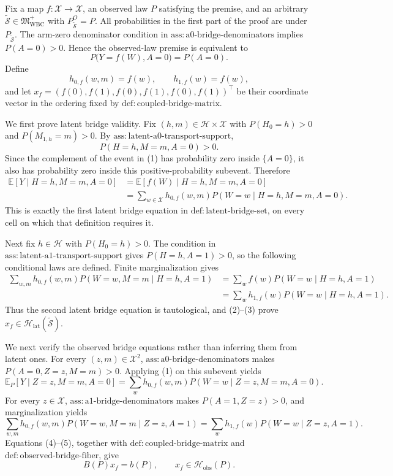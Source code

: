 Fix a map \(f:\mathcal X\to\mathcal X\), an observed law \(P\) satisfying the premise, and an arbitrary \(\widetilde{\mathcal S}\in\mathfrak M_{\mathrm{WBC}}^{+}\) with \(P_{\widetilde{\mathcal S}}^O=P\). All probabilities in the first part of the proof are under \(P_{\widetilde{\mathcal S}}\). The arm-zero denominator condition in \(\mathrm{ass{:}a0\text{-}bridge\text{-}denominators}\) implies \(P(A=0)>0\). Hence the observed-law premise is equivalent to
\[
P\bigl(Y=f(W),A=0\bigr)=P(A=0).
\tag{1}
\]
Define
\[
h_{0,f}(w,m)=f(w),\qquad h_{1,f}(w)=f(w),
\]
and let \(x_f=(f(0),f(1),f(0),f(1),f(0),f(1))^{\top}\) be their coordinate vector in the ordering fixed by \(\mathrm{def{:}coupled\text{-}bridge\text{-}matrix}\).

We first prove latent bridge validity. Fix \((h,m)\in\mathcal H\times\mathcal X\) with \(P(H_0=h)>0\) and \(P(M_{1,h}=m)>0\). By \(\mathrm{ass{:}latent\text{-}a0\text{-}transport\text{-}support}\),
\[
P(H=h,M=m,A=0)>0.
\]
Since the complement of the event in (1) has probability zero inside \(\{A=0\}\), it also has probability zero inside this positive-probability subevent. Therefore
\[
\begin{aligned}
\mathbb E[Y\mid H=h,M=m,A=0]
&=\mathbb E[f(W)\mid H=h,M=m,A=0]\\
&=\sum_{w\in\mathcal X}h_{0,f}(w,m)
  P(W=w\mid H=h,M=m,A=0).
\end{aligned}
\tag{2}
\]
This is exactly the first latent bridge equation in \(\mathrm{def{:}latent\text{-}bridge\text{-}set}\), on every cell on which that definition requires it.

Next fix \(h\in\mathcal H\) with \(P(H_0=h)>0\). The condition in \(\mathrm{ass{:}latent\text{-}a1\text{-}transport\text{-}support}\) gives \(P(H=h,A=1)>0\), so the following conditional laws are defined. Finite marginalization gives
\[
\begin{aligned}
\sum_{w,m}h_{0,f}(w,m)P(W=w,M=m\mid H=h,A=1)
&=\sum_w f(w)P(W=w\mid H=h,A=1)\\
&=\sum_wh_{1,f}(w)P(W=w\mid H=h,A=1).
\end{aligned}
\tag{3}
\]
Thus the second latent bridge equation is tautological, and (2)--(3) prove \(x_f\in\mathcal H_{\mathrm{lat}}(\widetilde{\mathcal S})\).

We next verify the observed bridge equations rather than inferring them from latent ones. For every \((z,m)\in\mathcal X^2\), \(\mathrm{ass{:}a0\text{-}bridge\text{-}denominators}\) makes \(P(A=0,Z=z,M=m)>0\). Applying (1) on this subevent yields
\[
\mathbb E_P[Y\mid Z=z,M=m,A=0]
=\sum_wh_{0,f}(w,m)P(W=w\mid Z=z,M=m,A=0).
\tag{4}
\]
For every \(z\in\mathcal X\), \(\mathrm{ass{:}a1\text{-}bridge\text{-}denominators}\) makes \(P(A=1,Z=z)>0\), and marginalization yields
\[
\sum_{w,m}h_{0,f}(w,m)P(W=w,M=m\mid Z=z,A=1)
=\sum_wh_{1,f}(w)P(W=w\mid Z=z,A=1).
\tag{5}
\]
Equations (4)--(5), together with \(\mathrm{def{:}coupled\text{-}bridge\text{-}matrix}\) and \(\mathrm{def{:}observed\text{-}bridge\text{-}fiber}\), give
\[
B(P)x_f=b(P),\qquad x_f\in\mathcal H_{\mathrm{obs}}(P).
\tag{6}
\]

